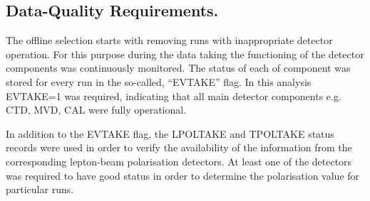\subsection{Data-Quality Requirements.}
The offline selection starts with removing runs with inappropriate detector operation. For this purpose during the data taking the functioning of the detector components was continuously monitored. The status of each of component was stored for every run in the so-called, ``EVTAKE'' flag. In this analysis EVTAKE=1 was required, indicating that all main detector components e.g. CTD, MVD, CAL were fully operational.

In addition to the EVTAKE flag, the LPOLTAKE and TPOLTAKE status records were used in order to verify the availability of the information from the corresponding lepton-beam polarisation detectors. At least one of the detectors was required to have good status in order to determine the polarisation value for particular runs.

